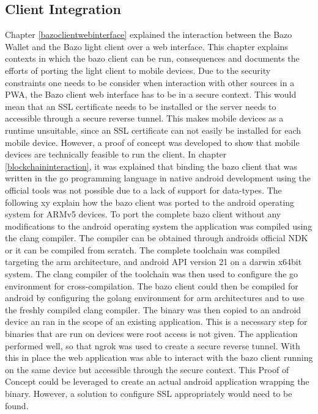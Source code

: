 \subsection{Client Integration}
Chapter \ref{bazoclientwebinterface} explained the interaction between the Bazo Wallet and the Bazo light client over a web interface.
This chapter explains contexts in which the bazo client can be run, consequences and documents the efforts of porting the light client to mobile devices.
Due to the security constraints one needs to be consider when interaction with other sources in a PWA, the Bazo client web interface has to be in a secure context. This would mean that an SSL certificate needs to be installed or the server needs to accessible through a secure reverse tunnel.
This makes mobile devices as a runtime unsuitable, since an SSL certificate can not easily be installed for each mobile device. However, a proof of concept was developed to show that mobile devices are technically feasible to run the client. In chapter \ref{blockchaininteraction}, it was explained that binding the bazo client that was written in the go programming language in native android development using the official tools was not possible due to a lack of support for data-types. The following xy explain how the bazo client was ported to the android operating system for ARMv5 devices.
To port the complete bazo client without any modifications to the android operating system the application was compiled  using the clang compiler. The compiler can be obtained through androids official NDK or it can be compiled from scratch. The complete toolchain was compiled targeting the arm architecture, and android API version 21 on a darwin x64bit system. The clang compiler of the toolchain was then used to configure the go environment for cross-compilation. The bazo client could then be compiled for android by configuring the golang environment for arm architectures and to use the freshly compiled clang compiler.
The binary was then copied to an android device an ran in the scope of an existing application. This is a necessary step for binaries that are run on devices were root access is not given. The application performed well, so that ngrok was used to create a secure reverse tunnel. With this in place the web application was able to interact with the bazo client running on the same device but accessible through the secure context.
This Proof of Concept could be leveraged to create an actual android application wrapping the binary. However, a solution to configure SSL appropriately would need to be found.

